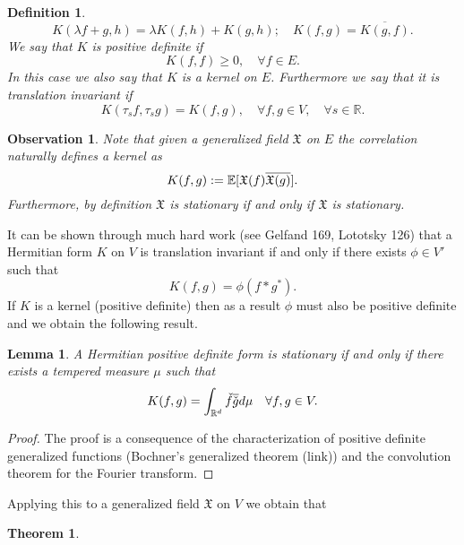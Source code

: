 \documentclass[12pt]{article}
\newtheorem{observation}{Observation}
\newtheorem{theorem}{Theorem}
\newtheorem{lemma}{Lemma}
\newtheorem{definition}{Definition}
\begin{document}
\begin{CJK*}{UTF8}{gbsn}
\begin{definition}
		\begin{equation*}
			K(\lambda f+g,h)=\lambda K(f,h)+K(g,h);\quad K(f,g)=\overline{K(g,f)}.
		\end{equation*}
		We say that $K$ is positive definite if $$K(f,f)\geq 0,\quad \forall f\in E.$$ In this case we also say that $K$ is a \emph{kernel} on $E$. Furthermore we say that it is translation invariant if $$K(\tau_s f,\tau_s g)=K(f,g),\quad \forall f,g \in V,\quad\forall s\in\mathbb{R}.$$
	\end{definition}
	\begin{observation}
		Note that given a generalized field $\mathfrak{X}$ on $E$ the correlation naturally defines a kernel as
		\begin{equation*}
			K(f,g):=\mathbb{E}[\mathfrak{X} (f)\overline{\mathfrak{X} (g)}].
		\end{equation*}
		Furthermore, by definition $\mathfrak{X}$ is stationary if and only if $\mathfrak{X}$ is stationary.
	\end{observation}
	It can be shown through much hard work (see Gelfand 169, Lototsky 126) that a Hermitian form $K$ on $V$ is translation invariant if and only if  there  exists $\phi\in V'$ such that
	\begin{equation*}
		K(f,g)=\phi(f*g^*).
	\end{equation*}
	If $K$ is a kernel (positive definite) then as a result $\phi$ must also be positive definite and we obtain the following result.
	\begin{lemma}
		A Hermitian positive definite form is stationary if and only if there exists a tempered measure $\mu $ such that
		\begin{equation*}
			K(f,g)=\int_{{\mathbb R}^d}\check{f}\overline{\check{g}}d \mu\quad\forall f,g\in V.
		\end{equation*}
	\end{lemma}
	\begin{proof}
		The proof is a consequence of the characterization of positive definite generalized functions (Bochner's generalized theorem (link)) and the convolution theorem for the Fourier transform.
	\end{proof}
	Applying this to a generalized field $\mathfrak{X}$ on $V$ we obtain that
	\begin{theorem}


\end{theorem}
\end{CJK*}
\end{document}
